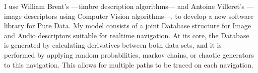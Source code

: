 I use William Brent's  ---timbre description algorithms--- and Antoine Villeret's \linebreak {} ---image descriptors using Computer Vision algorithms---, to develop a new software library for Pure Data. My model consists of a joint Database structure for Image and Audio descriptors suitable for realtime navigation. At its core, the Database is generated by calculating derivatives between both data sets, and it is performed by applying random probabilities, markov chains, or chaotic generators to this navigation. This allows for multiple paths to be traced on each navigation.
